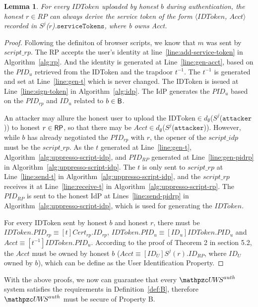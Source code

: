 \documentclass[letterpaper,onecolumn,10pt]{article}
\newtheorem{lemma}{Lemma}
\begin{document}
\begin{lemma}
For every $IDToken$ uploaded by honest $b$ during authentication, the honest $r \in RP$ can always derive the service token of the form $\langle IDToken$, $Acct \rangle$ recorded in $S^j$($r$).$\mathtt{serviceTokens}$, where b owns Acct. 
\end{lemma}
\begin{proof}
  Following the definiton of browser scripts, we know that $m$ was sent by $script\_rp$. 
  The RP accepts the user's identity at line~\ref{line:add-service-token} in Algorithm~\ref{alg:rp}.
  And the identity is generated at Line~\ref{line:gen-acct}, based on the $PID_u$ retrieved 
  from the IDToken and the trapdoor $t^{-1}$. The $t^{-1}$ is generated and set at 
  Line~\ref{line:gen-t} which is never changed. 
  The IDToken is issued at Line~\ref{line:sign-token} in Algorithm~\ref{alg:idp}.
  The IdP generates the $PID_u$ based on the $PID_{rp}$ and $ID_u$ related to $b \in \mathsf{B}$.

  An attacker may allure the honest user to upload the $\text{IDToken} \in d_{\emptyset}$($S^j$($\mathtt{attacker}$)) 
  to honest $r\in\mathsf{RP}$, so that there may be $Acct \in d_{\emptyset}$($S^j$($\mathtt{attacker}$)).
  However, while $b$ has already negotiated the $PID_{rp}$ with $r$, the opener of 
  the $script\_idp$ must be the $script\_rp$. As the $t$ generated at Line~\ref{line:gen-t}, 
  Algorithm~\ref{alg:uppresso-script-idp}, and $PID_{RP}$ generated at Line~\ref{line:gen-pidrp} 
  in Algorithm~\ref{alg:uppresso-script-idp}.
  The $t$ is only sent to $script\_rp$ at Line~\ref{line:send-t} in 
  Algorithm~\ref{alg:uppresso-script-idp}, 
  and the $script\_rp$ receives it at Line~\ref{line:receive-t} in 
  Algorithm~\ref{alg:uppresso-script-rp}.
  The $PID_{RP}$ is sent to the honest IdP at Lines~\ref{line:send-pidrp} in 
  Algorithm~\ref{alg:uppresso-script-idp},  which is used for generating the $IDToken$.

  For every IDToken sent by honest $b$ and honest $r$, there must be 
  $IDToken.PID_{rp} \equiv [t]Cert_{rp}.ID_{rp}$, 
  $IDToken.PID_u \equiv [ID_u]IDToken.PID_u$ and 
  $Acct \equiv [t^{-1}]IDToken.PID_u$. 
  According to the proof of {\color{blue}Theorem 2} in section 5.2, 
  the $Acct$ must be owned by honest $b$ ($Acct \equiv [ID_U]S^j(r).ID_{RP}$, 
  where $ID_U$ owned by $b$), which can be define as the  
  {\color{blue} User Identification Property}.
\end{proof}

With the above proofs, we now can guarantee that every $\uppressoauthwebsystem$ system satisfies the requirements in Definition~\ref{def:B}, therefore $\uppressoauthwebsystem$ must be secure of Property B.
\end{document}
